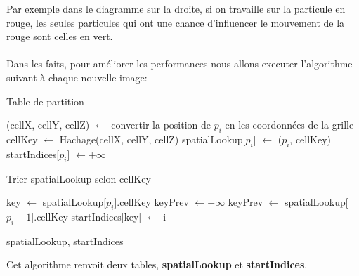 \documentclass[a4paper,10pt]{report}
\begin{document}
Par exemple dans le diagramme sur la droite, si on travaille sur la particule en rouge, les seules particules qui ont une chance d'influencer le mouvement de la rouge sont celles en vert.
\\
\\
Dans les faits, pour améliorer les performances nous allons executer l'algorithme suivant à chaque nouvelle image:
\begin{algorithm}
\caption{Table de partition}
\label{CHalgorithm}
\begin{algorithmic}[1]
\State (cellX, cellY, cellZ) $\leftarrow$ convertir la position de $p_i$ en les coordonnées de la grille
\State cellKey $\leftarrow$ Hachage(cellX, cellY, cellZ)
\State spatialLookup[$p_i$] $\leftarrow$ ($p_i$, cellKey)
\State startIndices[$p_i$] $\leftarrow +\infty$
\EndFor

\State Trier spatialLookup selon cellKey

\State key $\leftarrow$ spatialLookup[$p_i$].cellKey
\State keyPrev $\leftarrow +\infty$
\Else
\State keyPrev $\leftarrow$ spatialLookup[$p_i - 1$].cellKey
\EndIf
{}
\State startIndices[key] $\leftarrow$ i
\EndIf
\EndFor

\Return spatialLookup, startIndices
\EndProcedure
\end{algorithmic}
\end{algorithm}

Cet algorithme renvoit deux tables, \textbf{spatialLookup} et \textbf{startIndices}.
\end{document}
